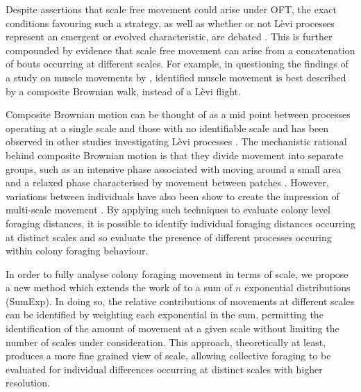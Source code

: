 \documentclass[11pt,usenames,dvipsnames]{article}
\begin{document}
\begin{linenumbers}
Despite assertions that scale free movement could arise under OFT, the exact conditions favouring such a strategy, as well as whether or not L\`evi processes represent an emergent or evolved characteristic, are debated \citep{Wosniack2017, Pyke2015, Kolzsch2015, DeJager2013}. This is further compounded by evidence that scale free movement can arise from a concatenation of bouts occurring at different scales. For example, in questioning the findings of a study on muscle movements by \cite{DeJager2011}, \cite{Jansen2012} identified muscle movement is best described by a composite Brownian walk, instead of a L\`evi flight.

Composite Brownian motion can be thought of as a mid point between processes operating at a single scale and those with no identifiable scale and has been observed in other studies investigating L\`evi processes \citep{Petrovskii2011, Sakamoto2017, Gautestad2012, Zhao2016}. The mechanistic rational behind composite Brownian motion is that they divide movement into separate groups, such as an intensive phase associated with moving around a small area and a relaxed phase characterised by movement between patches \citep{Auger-Methe2015}. However, variations between individuals have also been show to create the impression of multi-scale movement \citep{Petrovskii2011}. By applying such techniques to evaluate colony level foraging distances, it is possible to identify individual foraging distances occurring at distinct scales and so evaluate the presence of different processes occuring within colony foraging behaviour.

In order to fully analyse colony foraging movement in terms of scale, we propose a new method which extends the work of \cite{Petrovskii2011} to a sum of $n$ exponential distributions (SumExp). In doing so, the relative contributions of movements at different scales can be identified by weighting each exponential in the sum, permitting the identification of the amount of movement at a given scale without limiting the number of scales under consideration. This approach, theoretically at least, produces a more fine grained view of scale, allowing collective foraging to be evaluated for individual differences occurring at distinct scales with higher resolution.


\end{linenumbers}
\end{document}
